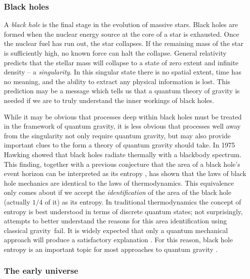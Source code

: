 \documentclass[aps,amssymb,12pt]{revtex4-2}
\begin{document}
\subsubsection{Black holes}

A {\it black hole} is the final stage in the evolution of massive stars.
Black holes are formed when the nuclear energy source at the core of a star
is exhausted. Once the nuclear fuel has run out, the star collapses. If the
remaining mass of the star is sufficiently high, no known force can halt the
collapse. General relativity predicts that the stellar mass will collapse to
a state of zero extent and infinite density -- a {\it singularity}. In this
singular state there is no spatial extent, time has no meaning, and the
ability to extract any physical information is lost. This prediction may be
a message which tells us that a quantum theory of gravity is needed if we
are to truly understand the inner workings of black holes.

While it may be obvious that processes deep within black holes must be
treated in the framework of quantum gravity, it is less obvious that
processes well away from the singularity not only require quantum gravity,
but may also provide important clues to the form a theory of quantum gravity
should take. In 1975 Hawking \cite{10} showed that black holes radiate thermally
with a blackbody spectrum. This finding, together with a previous conjecture
that the area of a black hole's event horizon can be interpreted as its
entropy \cite{11}, has shown that the laws of black hole mechanics are identical
to the laws of thermodynamics. This equivalence only comes about if we
accept the {\it identification} of the area of the black hole (actually $1/4$
of it) as its entropy. In traditional thermodynamics the concept of entropy
is best understood in terms of discrete quantum states; not surprisingly,
attempts to better understand the reasons for this area identification using
classical gravity{\it \ }fail. It is widely expected that only a quantum
mechanical approach will produce a satisfactory explanation \cite{12}. For this
reason, black hole entropy is an important topic for most approaches to
quantum gravity \cite{13}.

\subsubsection{The early universe}
\end{document}
